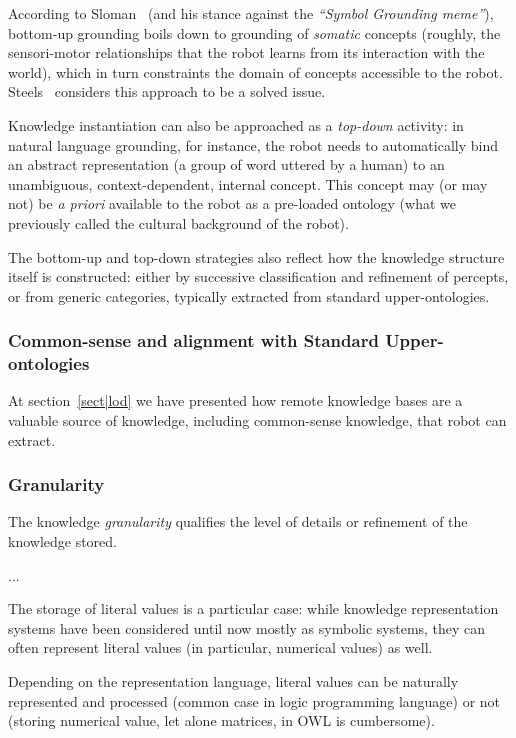 According to Sloman~\cite{Sloman2007} (and his stance against the
\emph{``Symbol Grounding meme''}), bottom-up grounding boils down to grounding
of \emph{somatic} concepts (\ie roughly, the sensori-motor relationships that
the robot learns from its interaction with the world), which in turn
constraints the domain of concepts accessible to the robot.
Steels~\cite{Steels2007} considers this approach to be a solved issue.

Knowledge instantiation can also be approached as a \emph{top-down} activity:
in natural language grounding, for instance, the robot needs to automatically
bind an abstract representation (a group of word uttered by a human) to an
unambiguous, context-dependent, internal concept. This concept may (or may not)
be \textit{a priori} available to the robot as a pre-loaded ontology (what we
previously called the cultural background of the robot).

The bottom-up and top-down strategies also reflect how the knowledge structure
itself is constructed: either by successive classification and refinement of
percepts, or from generic categories, typically extracted from standard
upper-ontologies.

\subsubsection{Common-sense and alignment with Standard Upper-ontologies}

At section~\ref{sect|lod} we have presented how remote knowledge bases are a
valuable source of knowledge, including common-sense knowledge, that robot can
extract.

\subsubsection{Granularity}

The knowledge \emph{granularity} qualifies the level of details or refinement
of the knowledge stored.

...

The storage of literal values is a particular case: while knowledge
representation systems have been considered until now mostly as symbolic
systems, they can often represent literal values (in particular, numerical
values) as well.

Depending on the representation language, literal values can be naturally
represented and processed (common case in logic programming language) or not
(storing numerical value, let alone matrices, in OWL is cumbersome).

